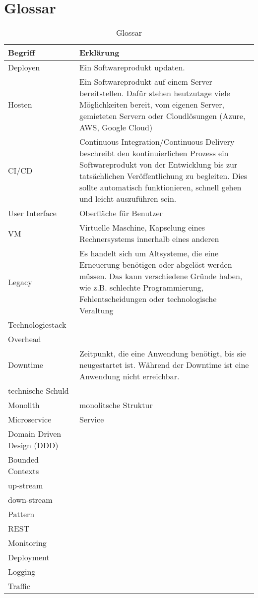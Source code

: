 \section{Glossar}
\begin{table}
	\begin{center}
		\begin{tabular}{lp{10cm}}
			Begriff & Erklärung \\ \hline
			Deployen & Ein Softwareprodukt updaten.  \\
			Hosten & Ein Softwareprodukt auf einem Server bereitstellen. Dafür stehen heutzutage viele Möglichkeiten bereit, vom eigenen Server, gemieteten Servern oder Cloudlösungen (Azure, AWS, Google Cloud) \\
			CI/CD & Continuous Integration/Continuous Delivery beschreibt den kontinuierlichen Prozess ein Softwareprodukt von der Entwicklung bis zur tatsächlichen Veröffentlichung zu begleiten. Dies sollte automatisch funktionieren, schnell gehen und leicht auszuführen sein.  \\
			User Interface  & Oberfläche für Benutzer  \\
			VM & Virtuelle Maschine, Kapselung eines Rechnersystems innerhalb eines anderen  \\
			Legacy & Es handelt sich um Altsysteme, die eine Erneuerung benötigen oder abgelöst werden müssen. Das kann verschiedene Gründe haben, wie z.B. schlechte Programmierung, Fehlentscheidungen oder technologische Veraltung   \\
			Technologiestack &   \\
			Overhead &   \\
			Downtime & Zeitpunkt, die eine Anwendung benötigt, bis sie neugestartet ist. Während der Downtime ist eine Anwendung nicht erreichbar.  \\
			technische Schuld &   \\
			Monolith & monolitsche Struktur \\
			Microservice & Service  \\	
			Domain Driven Design (DDD) &  \\	
			Bounded Contexts & \\
			up-stream & \\
			down-stream & \\
			Pattern & \\
			REST & \\
			Monitoring & \\
			Deployment & \\
			Logging & \\
			Traffic & \\
			\end{tabular}
	\end{center}
	\caption[Glossar]{Glossar}
\end{table}